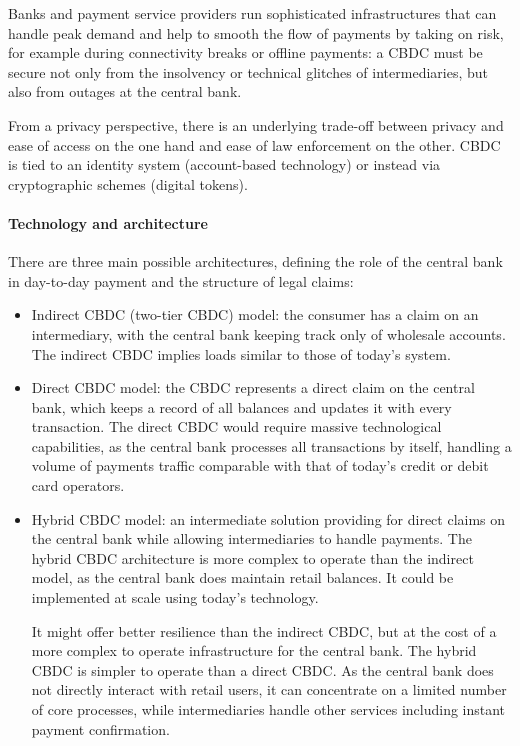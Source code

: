 Banks and payment service providers run sophisticated infrastructures that can handle peak demand and help to smooth the flow of payments by taking on risk, for example during connectivity breaks or offline payments: a CBDC must be secure not only from the insolvency or technical glitches of intermediaries, but also from outages at the central bank.

From a privacy perspective, there is an underlying trade-off between privacy and ease of access on the one hand and ease of law enforcement on the other. CBDC is tied to an identity system (account-based technology) or instead via cryptographic schemes (digital tokens).

\paragraph{Technology and architecture}

There are three main possible architectures, defining the role of the central bank in day-to-day payment and the structure of legal claims:
\begin{itemize}
    \item Indirect CBDC (two-tier CBDC) model: the consumer has a claim on an intermediary, with the central bank keeping track only of wholesale accounts. The indirect CBDC implies loads similar to those of today's system.
    \item Direct CBDC model: the CBDC represents a direct claim on the central bank, which keeps a record of all balances and updates it with every transaction. The direct CBDC would require massive technological capabilities, as the central bank processes all transactions by itself, handling a volume of payments traffic comparable with that of today's credit or debit card operators.
    \item Hybrid CBDC model: an intermediate solution providing for direct claims on the central bank while allowing intermediaries to handle payments. The hybrid CBDC architecture is more complex to operate than the indirect model, as the central bank does maintain retail balances. It could be implemented at scale using today's technology.

    It might offer better resilience than the indirect CBDC, but at the cost of a more complex to operate infrastructure for the central bank. The hybrid CBDC is simpler to operate than a direct CBDC. As the central bank does not directly interact with retail users, it can concentrate on a limited number of core processes, while intermediaries handle other services including instant payment confirmation.
\end{itemize}


